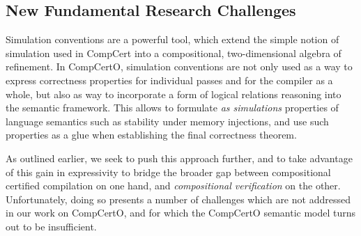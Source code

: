 %
%


\subsection{New Fundamental Research Challenges} %

Simulation conventions are a powerful tool,
which extend the simple notion of simulation used in CompCert
into a compositional, two-dimensional algebra of refinement.
In CompCertO,
simulation conventions are
not only used as a way to express correctness properties for
individual passes and for the compiler as a whole,
but also as way to incorporate a form of logical relations reasoning
into the semantic framework.
This allows to formulate \emph{as simulations}
properties of language semantics such as
stability under memory injections,
and use such properties as a glue
when establishing the final correctness theorem.

As outlined earlier,
we seek to push this approach further,
and to take advantage of this gain in expressivity
to bridge the broader gap between
compositional certified compilation on one hand, and
\emph{compositional verification} on the other.
Unfortunately,
doing so presents a number of challenges
which are not addressed in our work on CompCertO,
and for which the CompCertO semantic model
turns out to be insufficient.

